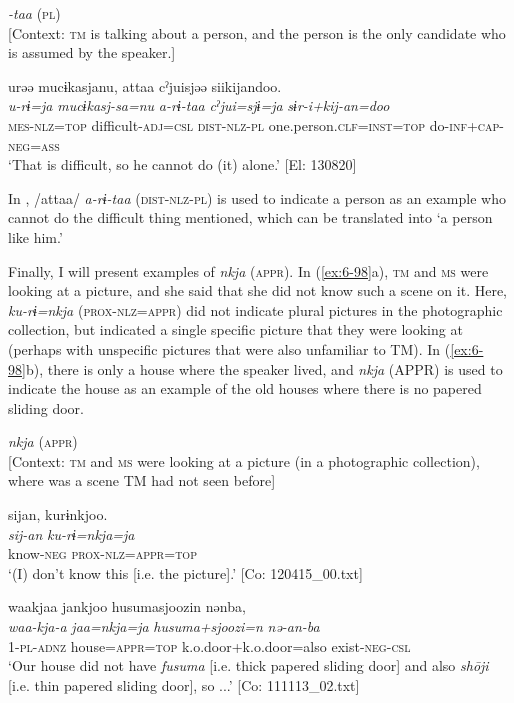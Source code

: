 \ea\label{ex:6-97}
  \textit{-taa} (\textsc{pl})\\{}
  [Context: \textsc{tm} is talking about a person, and the person is the only candidate who is assumed by the speaker.]

{\TM}
\glll urəə  mucɨkasjanu,  attaa cˀjuisjəə  siikijandoo.\\
\textit{u-rɨ=ja}  \textit{mucɨkasj-sa=nu}  \textit{a-rɨ-taa}    \textit{cˀjui=sjɨ=ja}  \textit{sɨr-i+kij-an=doo}\\
    \textsc{mes}-\textsc{nlz}=\textsc{top}  difficult-\textsc{adj}=\textsc{csl}  \textsc{dist}-\textsc{nlz}-\textsc{pl} one.person.\textsc{clf}=\textsc{inst}=\textsc{top}  do-\textsc{inf}+\textsc{cap}-\textsc{neg}=\textsc{ass}\\
\glt    ‘That is difficult, so he cannot do (it) alone.’ [El: 130820]
\z


In , /attaa/ \textit{a-rɨ-taa} (\textsc{dist}-\textsc{nlz}-\textsc{pl}) is used to indicate a person as an example who cannot do the difficult thing mentioned, which can be translated into ‘a person like him.’

  Finally, I will present examples of \textit{nkja} (\textsc{appr}). In (\ref{ex:6-98}a), \textsc{tm} and \textsc{ms} were looking at a picture, and she said that she did not know such a scene on it. Here, \textit{ku-rɨ=nkja} (\textsc{prox}-\textsc{nlz}=\textsc{appr}) did not indicate plural pictures in the photographic collection, but indicated a single specific picture that they were looking at (perhaps with unspecific pictures that were also unfamiliar to TM). In (\ref{ex:6-98}b), there is only a house where the speaker lived, and \textit{nkja} (APPR) is used to indicate the house as an example of the old houses where there is no papered sliding door.

\ea\label{ex:6-98}
  \textit{nkja} (\textsc{appr})\\{}
  [Context: \textsc{tm} and \textsc{ms} were looking at a picture (in a photographic collection), where was a scene TM had not seen before]

 {\TM}
 \ea
\glll  sijan,  kurɨnkjoo.\\
\textit{sij-an}  \textit{ku-rɨ=nkja=ja}\\
know-\textsc{neg}  \textsc{prox}-\textsc{nlz}=\textsc{appr}=\textsc{top}\\
\glt ‘(I) don’t know this [i.e. the picture].’ [Co: 120415\_00.txt]

{\TM}
\ex
\glll waakjaa  jankjoo  {\textbar}husumasjoozi{\textbar}n  nənba,\\
 \textit{waa-kja-a}  \textit{jaa=nkja=ja}  \textit{husuma+sjoozi=n}  \textit{nə-an-ba}\\
1-\textsc{pl}-\textsc{adnz}  house=\textsc{appr}=\textsc{top}  k.o.door+k.o.door=also  exist-\textsc{neg}-\textsc{csl}\\
\glt ‘Our house did not have \textit{fusuma} [i.e. thick papered sliding door] and also \textit{shōji} [i.e. thin papered sliding door], so ...’ [Co: 111113\_02.txt]
\z
\z

